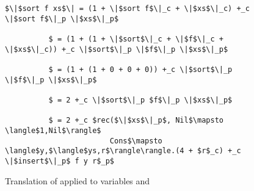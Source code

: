 %
\begin{figure}[H]
  \caption{Translation of  applied to variables  and }
\label{fig:sort_applied}
\begin{lstlisting}
$\|$sort f xs$\| = (1 + \|$sort f$\|_c + \|$xs$\|_c) +_c \|$sort f$\|_p \|$xs$\|_p$

          $ = (1 + (1 + \|$sort$\|_c + \|$f$\|_c + \|$xs$\|_c)) +_c \|$sort$\|_p \|$f$\|_p \|$xs$\|_p$

          $ = (1 + (1 + 0 + 0 + 0)) +_c \|$sort$\|_p \|$f$\|_p \|$xs$\|_p$

          $ = 2 +_c \|$sort$\|_p $f$\|_p \|$xs$\|_p$

          $ = 2 +_c $rec($\|$xs$\|_p$, Nil$\mapsto \langle$1,Nil$\rangle$
                        Cons$\mapsto \langle$y,$\langle$ys,r$\rangle\rangle.(4 + $r$_c) +_c \|$insert$\|_p$ f y r$_p$
\end{lstlisting}
\end{figure}
%
%

